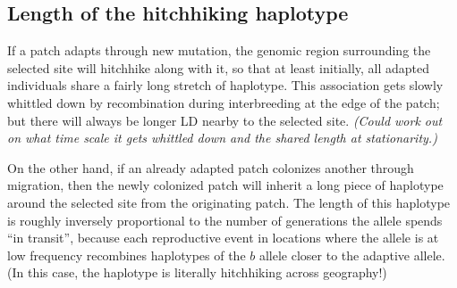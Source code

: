 \documentclass{article}
\newcommand{\plr}[1]{{\it\color{blue}(#1)}}
\begin{document}
\subsection{Length of the hitchhiking haplotype}
\label{ss:haplotype_length}

If a patch adapts through new mutation, the genomic region surrounding the selected site will hitchhike \citep{maynardsmith1974hitchhiking,kaplan1989hitchhiking} along with it,
so that at least initially, all adapted individuals share a fairly long stretch of haplotype.
This association gets slowly whittled down by recombination during interbreeding at the edge of the patch;
but there will always be longer LD nearby to the selected site.
\plr{Could work out on what time scale it gets whittled down and the shared length at stationarity.}

On the other hand, if an already adapted patch colonizes another through migration,
then the newly colonized patch will inherit a long piece of haplotype around the selected site from the originating patch.
The length of this haplotype is roughly inversely proportional to the number of generations the allele spends ``in transit'',
because each reproductive event in locations where the allele is at low frequency
recombines haplotypes of the $b$ allele closer to the adaptive allele.
(In this case, the haplotype is literally hitchhiking across geography!)
\end{document}
